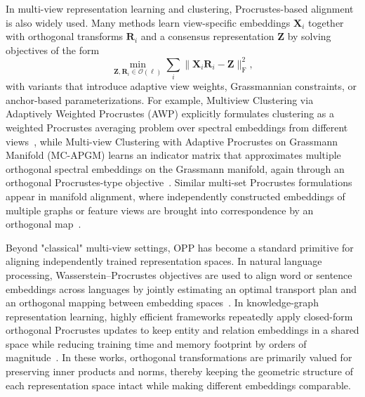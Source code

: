 \documentclass[final,3p,times]{elsarticle}
\theoremstyle{plain}
\newcommand{\matr}[1]{\bm{#1}}        %
\begin{document}
In multi-view representation learning and clustering, Procrustes-based alignment is also widely used. Many methods learn view-specific embeddings $\matr{X}_i$ together with orthogonal transforms $\matr{R}_i$ and a consensus representation $\matr{Z}$ by solving objectives of the form
\begin{equation}
  \min_{\matr{Z},\matr{R}_i \in \mathcal{O}(\ell)} \sum_{i} \bigl\| \matr{X}_i \matr{R}_i - \matr{Z} \bigr\|_\mathrm{F}^2,
  \label{eq:mv-procrustes-generic}
\end{equation}
with variants that introduce adaptive view weights, Grassmannian constraints, or anchor-based parameterizations. For example, Multiview Clustering via Adaptively Weighted Procrustes (AWP) explicitly formulates clustering as a weighted Procrustes averaging problem over spectral embeddings from different views~\cite{Nie2018AWP}, while Multi-view Clustering with Adaptive Procrustes on Grassmann Manifold (MC-APGM) learns an indicator matrix that approximates multiple orthogonal spectral embeddings on the Grassmann manifold, again through an orthogonal Procrustes-type objective~\cite{Dong2022GrassmannProcrustes}. Similar multi-set Procrustes formulations appear in manifold alignment, where independently constructed embeddings of multiple graphs or feature views are brought into correspondence by an orthogonal map~\cite{Wang2008ManifoldProcrustes}.  

Beyond "classical" multi-view settings, OPP has become a standard primitive for aligning independently trained representation spaces. In natural language processing, Wasserstein--Procrustes objectives are used to align word or sentence embeddings across languages by jointly estimating an optimal transport plan and an orthogonal mapping between embedding spaces~\cite{Grave2019WassersteinProcrustes}. In knowledge-graph representation learning, highly efficient frameworks repeatedly apply closed-form orthogonal Procrustes updates to keep entity and relation embeddings in a shared space while reducing training time and memory footprint by orders of magnitude~\cite{Peng2021ProcrustesKGE}. In these works, orthogonal transformations are primarily valued for preserving inner products and norms, thereby keeping the geometric structure of each representation space intact while making different embeddings comparable.  
\end{document}
